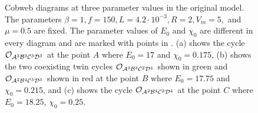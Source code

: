 \clearpage

\begin{figure}
	\centering
	\caption[Cobweb diagrams at three parameter values in the original model]{
		Cobweb diagrams at three parameter values in the original model.
		The parameters $\beta = 1, f = 150, L = 4.2 \cdot 10^{-3}, R = 2, V_m = 5,$ and $\mu = 0.5$ are fixed.
		The parameter values of $E_0$ and $\chi_0$ are different in every diagram and are marked with points in .
		(a) shows the cycle $\mathcal{O}_{\mathcal{A}^3\mathcal{B}^3\mathcal{C}^3\mathcal{D}^3}$ at the point $A$ where $E_0 = 17$ and $\chi_0 = 0.175$,
		(b) shows the two coexisting twin cycles $\mathcal{O}_{\mathcal{A}^3\mathcal{B}^3\mathcal{C}^2\mathcal{D}^4}$ shown in green and $\mathcal{O}_{\mathcal{A}^2\mathcal{B}^4\mathcal{C}^3\mathcal{D}^3}$ shown in red at the point $B$ where $E_0 = 17.75$ and $\chi_0 = 0.215$,
		and (c) shows the cycle $\mathcal{O}_{\mathcal{A}^2\mathcal{B}^4\mathcal{C}^2\mathcal{D}^4}$ at the point $C$ where $E_0 = 18.25$, $\chi_0 = 0.25$.
	}
	\label{fig:state.og.dynamics.cobwebs}
\end{figure}

